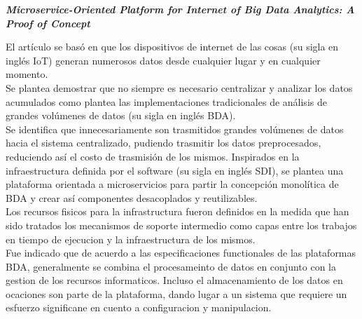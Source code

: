 
\textbf{\emph{Microservice-Oriented Platform for Internet of Big
Data Analytics: A Proof of Concept}} \cite{li_microservice-oriented_2019} 
 
El artículo se basó en que los dispositivos de internet de las cosas (su sigla en inglés IoT) generan numerosos datos desde cualquier lugar y en cualquier momento.
\\
 Se plantea demostrar que no siempre es necesario centralizar y analizar los datos acumulados como plantea las implementaciones tradicionales de análisis de grandes volúmenes de datos (su sigla en inglés BDA).
\\

Se identifica que innecesariamente son trasmitidos grandes volúmenes de datos hacia el sistema centralizado, pudiendo trasmitir los datos preprocesados, reduciendo así el costo de trasmisión de los mismos. 
Inspirados en la infraestructura definida por el software (su sigla en inglés SDI), se plantea una plataforma orientada a microservicios para partir la concepción monolítica de BDA y crear así componentes desacoplados y reutilizables.
\\

Los recursos fisicos para la infrastructura fueron definidos en la medida que han sido tratados los mecanismos de soporte intermedio como capas entre los trabajos en tiempo de ejecucion y la infraestructura de los mismos.
\\
Fue indicado que  de acuerdo a las especificaciones functionales de las plataformas BDA, generalmente se combina el procesameinto de datos en conjunto con la gestion de los recursos informaticos. Incluso el almacenamiento de los datos en ocaciones son parte de la plataforma, dando lugar a un sistema que requiere un esfuerzo significane en cuento a configuracion y manipulacion. 